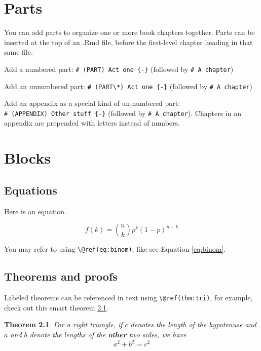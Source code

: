 \documentclass[
]{book}
\newtheorem{theorem}{Theorem}[chapter]
\theoremstyle{definition}
\theoremstyle{definition}
\theoremstyle{definition}
\theoremstyle{definition}
\theoremstyle{remark}
\begin{document}
\hypertarget{parts}{%
\chapter{Parts}\label{parts}}

You can add parts to organize one or more book chapters together. Parts can be inserted at the top of an .Rmd file, before the first-level chapter heading in that same file.

Add a numbered part: \texttt{\#\ (PART)\ Act\ one\ \{-\}} (followed by \texttt{\#\ A\ chapter})

Add an unnumbered part: \texttt{\#\ (PART\textbackslash{}*)\ Act\ one\ \{-\}} (followed by \texttt{\#\ A\ chapter})

Add an appendix as a special kind of un-numbered part: \texttt{\#\ (APPENDIX)\ Other\ stuff\ \{-\}} (followed by \texttt{\#\ A\ chapter}). Chapters in an appendix are prepended with letters instead of numbers.

\hypertarget{blocks}{%
\chapter{Blocks}\label{blocks}}

\hypertarget{equations}{%
\section{Equations}\label{equations}}

Here is an equation.

\begin{equation} 
  f\left(k\right) = \binom{n}{k} p^k\left(1-p\right)^{n-k}
  \label{eq:binom}
\end{equation}

You may refer to using \texttt{\textbackslash{}@ref(eq:binom)}, like see Equation \eqref{eq:binom}.

\hypertarget{theorems-and-proofs}{%
\section{Theorems and proofs}\label{theorems-and-proofs}}

Labeled theorems can be referenced in text using \texttt{\textbackslash{}@ref(thm:tri)}, for example, check out this smart theorem \ref{thm:tri}.

\begin{theorem}
\protect\hypertarget{thm:tri}{}\label{thm:tri}For a right triangle, if \(c\) denotes the \emph{length} of the hypotenuse
and \(a\) and \(b\) denote the lengths of the \textbf{other} two sides, we have
\[a^2 + b^2 = c^2\]
\end{theorem}
\end{document}
